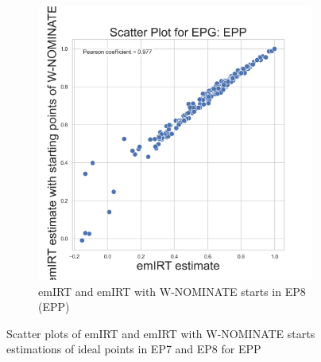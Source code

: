 \documentclass[a4paper,12pt]{report}
\begin{document}
\begin{figure}[H]
\begin{subfigure}[b]{0.48\textwidth}
            \includegraphics[width=\textwidth]{Graphs/ScatterEMEIGEN_8_EPG_EPP}
            \caption{emIRT and emIRT with W-NOMINATE starts in EP8 (EPP)}
            \label{fig:EMEIGEN_SCATTER_8EPP}
        \end{subfigure}
        \caption
        {Scatter plots of emIRT and emIRT with W-NOMINATE starts estimations of ideal points in EP7 and EP8 for EPP}
        \label{fig:EMEIGEN_SCATTER_7_8EPP}
    \end{figure}
\end{document}
